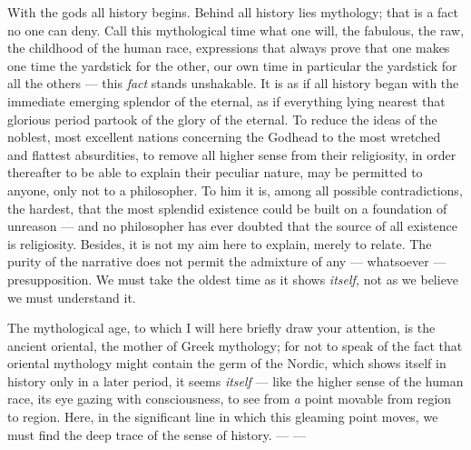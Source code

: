 \documentclass[12pt,a4paper,openany]{book}
\newcommand{\opage}[1]{\marginnote{\footnotesize\textit{[#1]}}}
\begin{document}
With the gods all history begins. Behind all history lies mythology; that is a fact
no one can deny. Call this mythological time what one will, the fabulous, the raw,
the childhood of the human race, expressions that always prove that one makes one
time the yardstick for the other, our own time in particular the yardstick for all
the others --- this \textit{fact} stands unshakable. It is as if all history began
with the immediate emerging splendor of the eternal, as if everything lying nearest
that glorious period partook of the glory of the eternal. To reduce the ideas of the
noblest, most excellent nations concerning the Godhead to the most wretched and
\setcounter{footnote}{0}%
\opage{52}flattest absurdities, to remove all higher sense from their religiosity, in order
thereafter to be able to explain their peculiar nature, may be permitted to anyone,
only not to a philosopher. To him it is, among all possible contradictions, the
hardest, that the most splendid existence could be built on a foundation of
unreason --- and no philosopher has ever doubted that the source of all existence is
religiosity. Besides, it is not my aim here to explain, merely to relate. The purity
of the narrative does not permit the admixture of any --- whatsoever
--- presupposition. We must take the oldest time as it shows \textit{itself,} not as
we believe we must understand it.

The mythological age, to which I will here briefly draw your attention, is the
ancient oriental, the mother of Greek mythology; for not to speak of the fact that
oriental mythology might contain the germ of the Nordic, which shows itself in
history only in a later period, it seems \textit{itself} --- like the higher sense of
the human race, its eye gazing with consciousness, to see from \textit{a} point movable from
region to region. Here, in the significant line in which this gleaming point moves,
we must find the deep trace of the sense of history. --- ---
\end{document}
